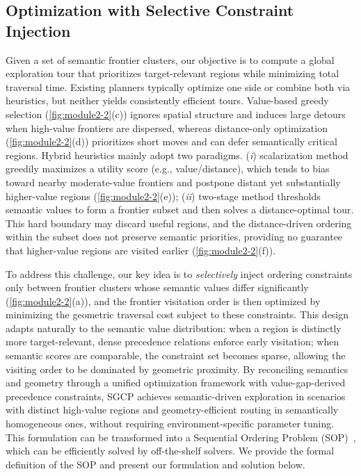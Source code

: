 \subsection{Optimization with Selective Constraint Injection}\label{V-C}
Given a set of semantic frontier clusters, our objective is to compute a global exploration tour that prioritizes target-relevant regions while minimizing total traversal time. Existing planners typically optimize one side or combine both via heuristics, but neither yields consistently efficient tours. Value-based greedy selection (\fig\ref{fig:module2-2}(c)) ignores spatial structure and induces large detours when high-value frontiers are dispersed, whereas distance-only optimization (\fig\ref{fig:module2-2}(d)) prioritizes short moves and can defer semantically critical regions. Hybrid heuristics mainly adopt two paradigms. (\textit{i}) scalarization method greedily maximizes a utility score (e.g., value/distance), which tends to bias toward nearby moderate-value frontiers and postpone distant yet substantially higher-value regions (\fig\ref{fig:module2-2}(e)); (\textit{ii}) two-stage method thresholds semantic values to form a frontier subset and then solves a distance-optimal tour. This hard boundary may discard useful regions, and the distance-driven ordering within the subset does not preserve semantic priorities, providing no guarantee that higher-value regions are visited earlier (\fig\ref{fig:module2-2}(f)).


To address this challenge, our key idea is to \textit{selectively} inject ordering constraints only between frontier clusters whose semantic values differ significantly (\fig\ref{fig:module2-2}(a)), and the frontier visitation order is then optimized by minimizing the geometric traversal cost subject to these constraints. 
This design adapts naturally to the semantic value distribution: when a region is distinctly more target-relevant, dense precedence relations enforce early visitation; when semantic scores are comparable, the constraint set becomes sparse, allowing the visiting order to be dominated by geometric proximity. 
By reconciling semantics and geometry through a unified optimization framework with value-gap-derived precedence constraints, SGCP achieves semantic-driven exploration in scenarios with distinct high-value regions and geometry-efficient routing in semantically homogeneous ones, without requiring environment-specific parameter tuning.
This formulation can be transformed into a Sequential Ordering Problem (SOP)~\cite{hernadvolgyi2004solving}, which can be efficiently solved by off-the-shelf solvers. We provide the formal definition of the SOP and present our formulation and solution below.

